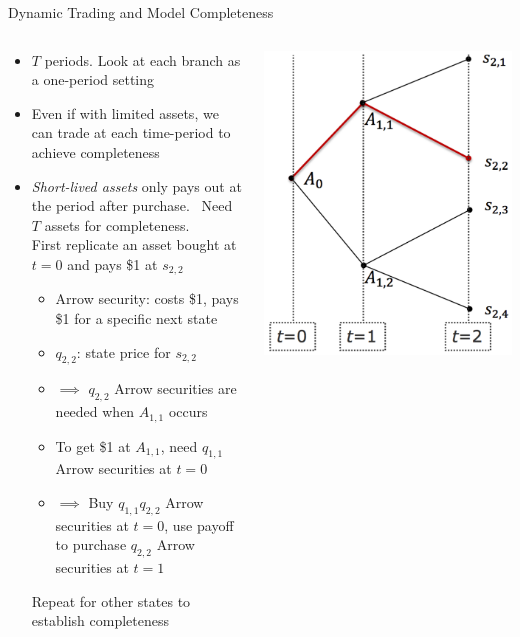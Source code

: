 \documentclass[aspectratio=1610]{beamer}
\begin{document}
\begin{frame}{Dynamic Trading and Model Completeness}
\begin{columns}
\begin{column}{0.68\textwidth}
  \begin{itemize}
    \item $T$ periods. Look at each branch as a one-period setting
    \item Even if with limited assets, we can trade at each time-period to achieve completeness
    \item {\em Short-lived assets} only pays out at the period after purchase.
      \ Need $T$ assets for completeness.
      \\ First replicate an asset bought at $t=0$ and pays \$1 at $s_{2,2}$
    \begin{itemize}
      \item Arrow security: costs \$1, pays \$1 for a specific next state
      \item $q_{2,2}$: state price for $s_{2,2}$
      \item $\implies$ $q_{2,2}$ Arrow securities are needed when $A_{1,1}$ occurs
      \item To get \$1 at $A_{1,1}$, need $q_{1,1}$ Arrow securities at $t=0$
      \item $\implies$ Buy $q_{1,1}q_{2,2}$ Arrow securities at $t=0$, use payoff to purchase $q_{2,2}$ Arrow securities at $t=1$
    \end{itemize}
    Repeat for other states to establish completeness
  \end{itemize}
\end{column}
\begin{column}{0.3\textwidth}
  \includegraphics[width=\textwidth]{images/short-lived.PNG}

\end{column}
\end{columns}
\end{frame}
\end{document}
